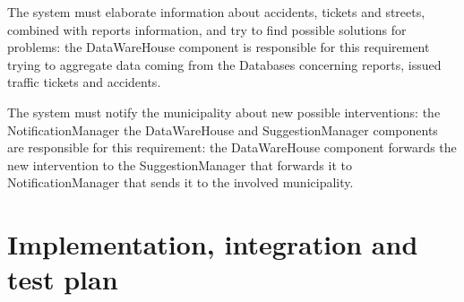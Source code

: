 \documentclass[a4paper]{report}
\begin{document}
\begin{enumerate}[start=1,label={[R\arabic*]}]
\item The system must elaborate information about accidents, tickets and streets, combined with reports information, and try to find possible solutions for problems: the DataWareHouse component is responsible for this requirement trying to aggregate data coming from the Databases concerning reports, issued traffic tickets and accidents.
\item The system must notify the municipality about new possible interventions: the NotificationManager the DataWareHouse and SuggestionManager components are responsible for this requirement: the DataWareHouse component forwards the new intervention to the SuggestionManager that forwards it to NotificationManager that sends it to  the involved municipality.

\end{enumerate}

\chapter{Implementation, integration and test plan}
\end{document}
